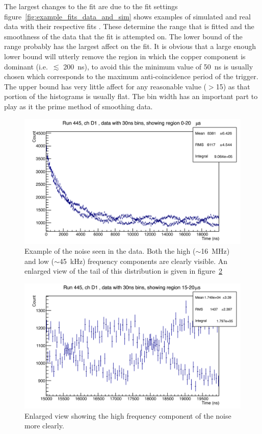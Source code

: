 The largest changes to the fit are due to the fit settings figure~\ref{fig:example_fits_data_and_sim} shows examples of simulated and real data with their respective fits . These determine the range that is fitted and the smoothness of the data that the fit is attempted on. The lower bound of the range probably has the largest affect on the fit. It is obvious that a large enough lower bound will utterly remove the region in which the copper component is dominant (i.e.\ $\lesssim$ 200~ns), to avoid this the minimum value of 50~ns is usually chosen which corresponds to the maximum anti-coincidence period of the trigger. The upper bound has very little affect for any reasonable value ($>$15\mus) as that portion of the histograms is usually flat. The bin width has an important part to play as it the prime method of smoothing data. 

\begin{figure}[htbp]
    \centering
        \includegraphics[width=\textwidth]{images/example_noise.png}
    \caption{Example of the noise seen in the data. Both the high ($\sim$16~MHz) and low ($\sim$45~kHz) frequency components are clearly visible. An enlarged view of the tail of this distribution is given in figure~\ref{fig:example_noise_zoom}}
    \label{fig:example_noise}
\end{figure}
%
\begin{figure}[htbp]
    \centering
        \includegraphics[width=\textwidth]{images/example_noise_zoom.png}
    \caption{Enlarged view showing the high frequency component of the noise more clearly.}
    \label{fig:example_noise_zoom}
\end{figure}

